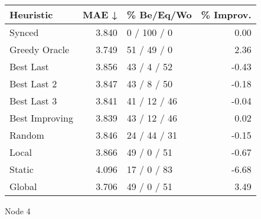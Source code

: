 \begin{tabular}{lrlr}
\toprule
\textbf{Heuristic} & \textbf{MAE ↓} & \textbf{\% Be/Eq/Wo} & \textbf{\% Improv.} \\
\midrule
            Synced &          3.840 &          0 / 100 / 0 &                0.00 \\
     Greedy Oracle &          3.749 &          51 / 49 / 0 &                2.36 \\
         Best Last &          3.856 &          43 / 4 / 52 &               -0.43 \\
       Best Last 2 &          3.847 &          43 / 8 / 50 &               -0.18 \\
       Best Last 3 &          3.841 &         41 / 12 / 46 &               -0.04 \\
    Best Improving &          3.839 &         43 / 12 / 46 &                0.02 \\
            Random &          3.846 &         24 / 44 / 31 &               -0.15 \\
             Local &          3.866 &          49 / 0 / 51 &               -0.67 \\
            Static &          4.096 &          17 / 0 / 83 &               -6.68 \\
            Global &          3.706 &          49 / 0 / 51 &                3.49 \\
\bottomrule
\end{tabular}
\caption{Node 4}
\label{tab:ds_non_lr05_le2_bs4_4}
